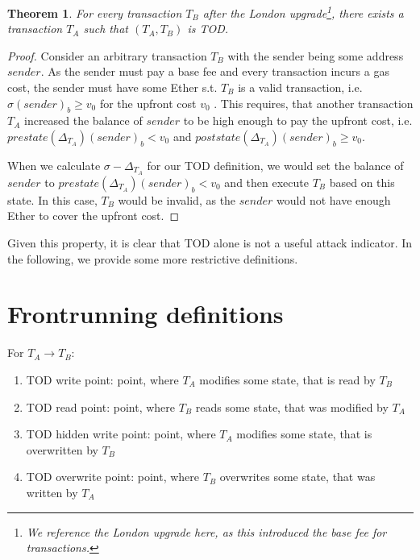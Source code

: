 \documentclass[draft,final]{vutinfth} %
\newtheorem{theorem}{Theorem}
\begin{document}
\begin{theorem}
    For every transaction $T_B$ after the London upgrade\footnote{We reference the London upgrade here, as this introduced the base fee for transactions.}, there exists a transaction $T_A$ such that $(T_A, T_B)$ is TOD.
\end{theorem}

\begin{proof}
    Consider an arbitrary transaction $T_B$ with the sender being some address $sender$. As the sender must pay a base fee and every transaction incurs a gas cost, the sender must have some Ether s.t. $T_B$ is a valid transaction, i.e. $\sigma(sender)_b \ge v_0$ for the upfront cost $v_0$ \cite[p.8-9]{wood_ethereum_2024}. This requires, that another transaction $T_A$ increased the balance of $sender$ to be high enough to pay the upfront cost, i.e. $prestate(\Delta_{T_A})(sender)_b < v_0$ and $poststate(\Delta_{T_A})(sender)_b \ge v_0$.

    When we calculate $\sigma - \Delta_{T_A}$ for our TOD definition, we would set the balance of $sender$ to $prestate(\Delta_{T_A})(sender)_b < v_0$ and then execute $T_B$ based on this state. In this case, $T_B$ would be invalid, as the $sender$ would not have enough Ether to cover the upfront cost.
\end{proof}

Given this property, it is clear that TOD alone is not a useful attack indicator. In the following, we provide some more restrictive definitions.

\iffalse
    \chapter{Frontrunning definitions}



    For $T_A \rightarrow T_B$:


    \begin{enumerate}
        \item TOD write point: point, where $T_A$ modifies some state, that is read by $T_B$
        \item TOD read point: point, where $T_B$ reads some state, that was modified by $T_A$
        \item TOD hidden write point: point, where $T_A$ modifies some state, that is overwritten by $T_B$
        \item TOD overwrite point: point, where $T_B$ overwrites some state, that was written by $T_A$
    \end{enumerate}
\end{document}
